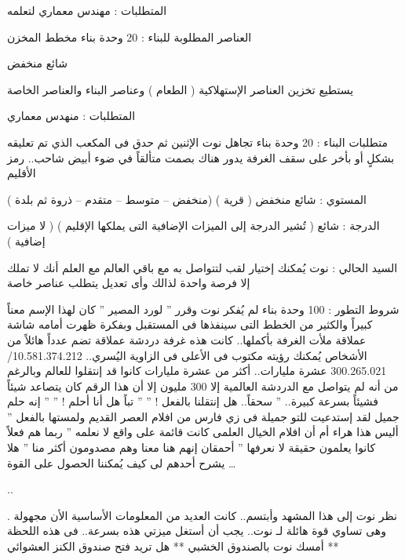 المتطلبات : مهندس معماري لتعلمه

العناصر المطلوبة للبناء : 20 وحدة بناء
مخطط المخزن

شائع منخفض

يستطيع تخزين العناصر الإستهلاكية ( الطعام ) وعناصر البناء والعناصر الخاصة

المتطلبات : منهدس معماري

متطلبات البناء : 20 وحدة بناء
تجاهل نوت الإثنين ثم حدق فى المكعب الذي تم تعليقه بشكلٍ أو بأخر على سقف الغرفة يدور هناك بصمت متألقاً في ضوء أبيض شاحب..
رمز الأقليم

المستوي : شائع منخفض ( قرية ) (منخفض – متوسط – متقدم – ذروة ثم بلدة )

الدرجة : شائع ( تُشير الدرجة إلى الميزات الإضافية التى يملكها الإقليم ) ( لا ميزات إضافية )

السيد الحالي : نوت { يُمكنك إختيار لقب لتتواصل به مع باقي العالم مع العلم أنك لا تملك إلا فرصة واحدة لذالك وأى تعديل يتطلب عناصر خاصة }

شروط التطور : 100 وحدة بناء
لم يُفكر نوت وقرر ” لورد المصير ”
كان لهذا الإسم معناً كبيراً والكثير من الخطط التى سينفذها فى المستقبل وبفكرة ظهرت أمامه شاشة عملاقة ملأت الغرفة بأكملها..
كانت هذه غرفة دردشة عملاقة تضم عدداً هائلاً من الأشخاص يُمكنك رؤيته مكتوب فى الأعلى فى الزاوية اليُسري..
10.581.374.212/ 300.265.021
عشرة مليارات..
أكثر من عشرة مليارات كانوا قد إنتقلوا للعالم وبالرغم من أنه لم يتواصل مع الدردشة العالمية إلا 300 مليون إلا أن هذا الرقم كان يتصاعد شيئاً فشيئاً بسرعة كبيرة..
” سحقاً.. هل إنتقلنا بالفعل ! ”
” تباً هل أنا أحلم ! ”
” إنه حلم جميل لقد إستدعيت للتو جميلة فى زي فارس من افلام العصر القديم ولمستها بالفعل
” أليس هذا هراء أم أن افلام الخيال العلمى كانت قائمة على واقع لا نعلمه
” ربما هم فعلاً كانوا يعلمون حقيقة لا نعرفها
” أحمقان إنهم هنا معنا وهم مصدومون أكثر منا
” هلا يشرح أحدهم لى كيف يُمكننا الحصول على القوة
…

..

.
نظر نوت إلى هذا المشهد وأبتسم..
كانت العديد من المعلومات الأساسية الأن مجهولة وهى تساوي قوة هائلة لـ نوت..
يجب أن أستغل ميزتي هذه بسرعة..
فى هذه اللحظة أمسك نوت بالصندوق الخشبي
** هل تريد فتح صندوق الكنز العشوائي **
